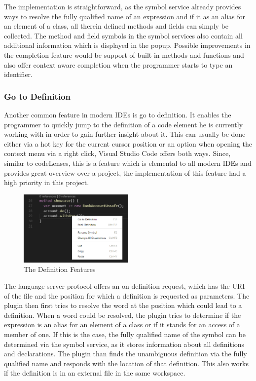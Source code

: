 The implementation is straightforward, as the symbol service already provides ways to resolve the fully qualified name of an expression and if it as an alias for an element of a class, all therein defined methods and fields can simply be collected. The method and field symbols in the symbol services also contain all additional information which is displayed in the popup. Possible improvements in the completion feature would be support of built in methods and functions and also offer context aware completion when the programmer starts to type an identifier. 

\subsubsection{Go to Definition} \label{gotodefinition}
Another common feature in modern IDEs is go to definition. It enables the programmer to quickly jump to the definition of a code element he is currently working with in order to gain further insight about it. This can usually be done either via a hot key for the current cursor position or an option when opening the context menu via a right click, Visual Studio Code offers both ways.\newline
Since, similar to codeLenses, this is a feature which is elemental to all modern IDEs and provides great overview over a project, the implementation of this feature had a high priority in this project. \newline
 \begin{figure}[H]
	\centering
	\includegraphics[width=0.5\textwidth]{img/goToDefinition}
	\caption{The Definition Features}
	\label{fig:gotodefinition}
\end{figure}
The language server protocol offers an on definition request, which has the URI of the file and the position for which a definition is requested as parameters. The plugin then first tries to resolve the word at the position which could lead to a definition. When a word could be resolved, the plugin tries to determine if the expression is an alias for an element of a class or if it stands for an access of a member of one. If this is the case, the fully qualified name of the symbol can be determined via the symbol service, as it stores information about all definitions and declarations. The plugin than finds the unambiguous definition via the fully qualified name and responds with the location of that definition. This also works if the definition is in an external file in the same workspace. \newline
